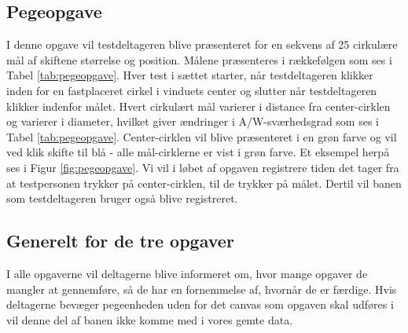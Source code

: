 
\subsection*{Pegeopgave}
I denne opgave vil testdeltageren blive præsenteret for en sekvens af 25 cirkulære mål af skiftene størrelse og position. Målene præsenteres i rækkefølgen som ses i Tabel \ref{tab:pegeopgave}. Hver test i sættet starter, når testdeltageren klikker inden for en fastplaceret cirkel i vinduets center og slutter når testdeltageren klikker indenfor målet. Hvert cirkulært mål varierer i distance fra center-cirklen og varierer i diameter, hvilket giver ændringer i A/W-sværhedsgrad som ses i Tabel \ref{tab:pegeopgave}. Center-cirklen vil  blive præsenteret i en grøn farve og vil ved klik skifte til blå - alle mål-cirklerne er vist i grøn farve. Et eksempel herpå ses i Figur \ref{fig:pegeopgave}. Vi vil i løbet af opgaven registrere tiden det tager fra at testpersonen trykker på center-cirklen, til de trykker på målet. Dertil vil banen som testdeltageren bruger også blive registreret.

\subsection*{Generelt for de tre opgaver}
I alle opgaverne vil deltagerne blive informeret om, hvor mange opgaver de mangler at gennemføre, så de har en fornemmelse af, hvornår de er færdige. Hvis deltagerne bevæger pegeenheden uden for det canvas som opgaven skal udføres i vil denne del af banen ikke komme med i vores gemte data.

